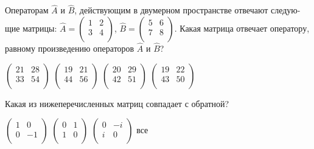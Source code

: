 \documentclass[11pt,a4paper]{exam}
\begin{document}
\begin{questions}
\question Операторам $\hat{A}$ и $\hat{B}$, действующим в двумерном пространстве отвечают следую-щие матрицы: $\hat{A}=\left( \begin{matrix}
   1 & 2  \\
   3 & 4  \\
\end{matrix} \right)$, $\hat{B}=\left( \begin{matrix}
   5 & 6  \\
   7 & 8  \\
\end{matrix} \right)$. Какая матрица отвечает оператору, равному произведению операторов $\hat{A}$ и $\hat{B}$?
\begin{choices}
\choice $\left( \begin{matrix}
   21 & 28  \\
   33 & 54  \\
\end{matrix} \right)$      
\choice $\left( \begin{matrix}
   19 & 21  \\
   44 & 56  \\
\end{matrix} \right)$      
\choice $\left( \begin{matrix}
   20 & 29  \\
   42 & 51  \\
\end{matrix} \right)$      
\choice $\left( \begin{matrix}
   19 & 22  \\
   43 & 50  \\
\end{matrix} \right)$
\end{choices}

\question Какая из нижеперечисленных матриц совпадает с обратной?
\begin{choices}
\choice $\left( \begin{matrix}
   1 & 0  \\
   0 & -1  \\
\end{matrix} \right)$      
\choice $\left( \begin{matrix}
   0 & 1  \\
   1 & 0  \\
\end{matrix} \right)$      
\choice $\left( \begin{matrix}
   0 & -i  \\
   i & 0  \\
\end{matrix} \right)$      
\choice все
\end{choices}


\end{questions}
\end{document}
